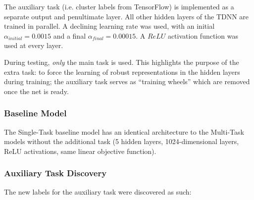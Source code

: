 \documentclass[a4paper]{article}
\begin{document}
The auxiliary task (i.e. cluster labels from TensorFlow) is implemented as a separate output and penultimate layer. All other hidden layers of the TDNN are trained in parallel. A declining learning rate was used, with an initial $\alpha_{initial}=0.0015$ and a final $\alpha_{final}=0.00015$. A $ReLU$ activation function was used at every layer.

During testing, \textit{only} the main task is used. This highlights the purpose of the extra task: to force the learning of robust representations in the hidden layers during training; the auxiliary task serves as ``training wheels'' which are removed once the net is ready.


\subsubsection{Baseline Model}

The Single-Task baseline model has an identical architecture to the Multi-Task models without the additional task (5 hidden layers, 1024-dimensional layers, ReLU activations, same linear objective function).
\subsubsection{Auxiliary Task Discovery}

The new labels for the auxiliary task were discovered as such:
\end{document}
